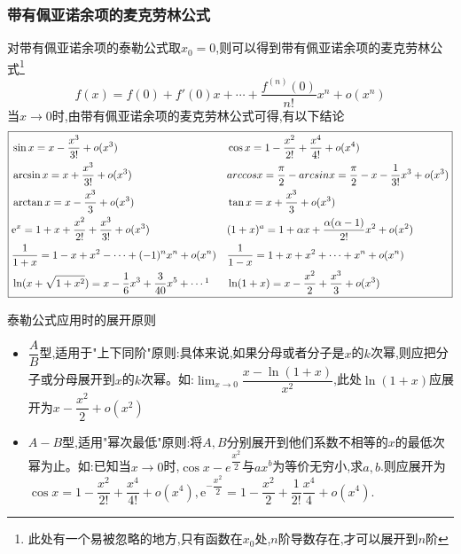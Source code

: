 \documentclass[8pt a4paper, oneside, UTF8]{ctexbook}
\begin{document}
\begin{sloppypar}
    \subsubsection{带有佩亚诺余项的麦克劳林公式}
    对带有佩亚诺余项的泰勒公式取$x_0=0$,则可以得到带有佩亚诺余项的麦克劳林公式\footnote{此处有一个易被忽略的地方,只有函数在$x_0$处,$n$阶导数存在,才可以展开到$n$阶}
    $$
    f(x)=f(0)+f'(0)x+\cdots+\dfrac{f^{(n)}(0)}{n!}x^{n}+o(x^{n})
    $$
    当$x\to 0$时,由带有佩亚诺余项的麦克劳林公式可得,有以下结论
    \begin{align*}
        \boxed{\begin{aligned}
                    & \sin x =x-\dfrac{x^3}{3!}+o(x^3)                                &  & \cos x =1-\dfrac{x^2}{2!}+\dfrac{x^4}{4!}+o(x^4)                  \\
                    & \arcsin x =x+\dfrac{x^3}{3!}+o(x^3)                             &  &                              arccosx=\frac\pi2-arcsinx=\frac\pi2-x-\frac1{3!}x^3+o(x^3)       \\
                    & \arctan x =x-\dfrac{x^{3}}{3}+o(x^{3})                          &  & \tan x =x+\dfrac{x^3}3+o(x^3)              \\
                    & \mathrm{e}^{x} =1+x+\dfrac{x^{2}}{2!}+\dfrac{x^{3}}{3!}+o(x^{3}) &  & (1+x)^{a} =1+\alpha x+\dfrac{\alpha(\alpha-1)}{2!}x^{2}+o(x^{2}) \\
                    & \dfrac{1}{1+x}=1-x+x^{2}-\cdots+(-1)^{n}x^{n}+o(x^{n})          &  &       \dfrac{1}{1-x}=1+x+x^{2}+\cdots+x^{n}+o(x^{n}) \\
                    & \ln (x+\sqrt{1+x^{2}})=x-\dfrac{1}{6}x^{3}+\dfrac{3}{40}x^{5}+\cdots \footnotemark[1]   & & \ln(1+x) =x-\dfrac{x^{2}}{2}+\dfrac{x^{3}}{3}+o(x^{3}) \\
                \end{aligned}}
    \end{align*}
    \begin{criterion}{泰勒公式应用时的展开原则}{}
        \begin{itemize}
            \item $\dfrac{A}{B}$型,适用于"上下同阶"原则:具体来说,如果分母或者分子是$x$的$k$次幂,则应把分子或分母展开到$x$的$k$次幂。如:$\lim_{x\to0}\dfrac{x-\ln(1+x)}{x^{2}}$,此处$\ln(1+x)$应展开为$x-\dfrac{x^2}{2}+o(x^2)$
            \item $A-B$型,适用"幂次最低"原则:将$A,B$分别展开到他们系数不相等的$x$的最低次幂为止。如:已知当$x\to0$时,$\cos x-e^{\dfrac{x^2}2}$与$ax^b$为等价无穷小,求$a,b$.则应展开为$\cos x=1-\dfrac{x^2}{2!}+\dfrac{x^4}{4!}+o(x^4),\mathrm{e}^{-\dfrac{x^2}{2}}=1-\dfrac{x^2}{2}+\dfrac{1}{2!}\dfrac{x^4}{4}+o(x^4).$

\end{itemize}
\end{criterion}
\end{sloppypar}
\end{document}
